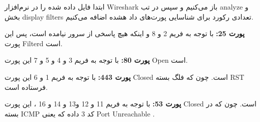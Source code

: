ابتدا فایل داده شده را در نرم‌افزار Wireshark باز می‌کنیم و سپس در تب analyze و بخش display filters تعدادی رکورد برای شناسایی پورت‌های داد هشده اضافه می‌کنیم.

{
	

}

\textbf{پورت 25:}
با توجه به فریم 2 و 8 و اینکه هیچ پاسخی از سرور نیامده است، پس این پورت Filterd است.

\textbf{پورت 80:}
با توجه به فریم 3 و 4 و 5 و 7 این پورت Open است.

\textbf{پورت 443:}
با توجه به فریم 1 و 6 این پورت Closed است. چون که فلگ بسته RST فرستاده است.

\textbf{پورت 53:}
با توجه به فریم 11 و 12 و13 و 14 و 16 ، این پورت Closed است.  چون که در بسته ICMP کد 3 داده که یعنی Port Unreachable .